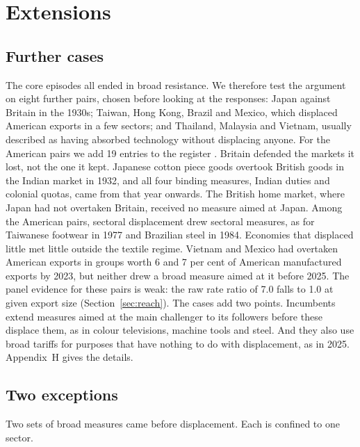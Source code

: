 \documentclass[review,authoryear,12pt]{elsarticle}
\begin{document}
\section{Extensions}\label{sec:extensions}

\subsection{Further cases}\label{sec:further}

The core episodes all ended in broad resistance. We therefore test the argument on eight further pairs, chosen before looking at the responses: Japan against Britain in the 1930s; Taiwan, Hong Kong, Brazil and Mexico, which displaced American exports in a few sectors; and Thailand, Malaysia and Vietnam, usually described as having absorbed technology without displacing anyone. For the American pairs we add 19 entries to the register \citep{statutes,moore1996,dinopoulos1991}. Britain defended the markets it lost, not the one it kept. Japanese cotton piece goods overtook British goods in the Indian market in 1932, and all four binding measures, Indian duties and colonial quotas, came from that year onwards. The British home market, where Japan had not overtaken Britain, received no measure aimed at Japan. Among the American pairs, sectoral displacement drew sectoral measures, as for Taiwanese footwear in 1977 and Brazilian steel in 1984. Economies that displaced little met little outside the textile regime. Vietnam and Mexico had overtaken American exports in groups worth 6 and 7 per cent of American manufactured exports by 2023, but neither drew a broad measure aimed at it before 2025. The panel evidence for these pairs is weak: the raw rate ratio of 7.0 falls to 1.0 at given export size (Section~\ref{sec:reach}). The cases add two points. Incumbents extend measures aimed at the main challenger to its followers before these displace them, as in colour televisions, machine tools and steel. And they also use broad tariffs for purposes that have nothing to do with displacement, as in 2025. Appendix~H gives the details.

\subsection{Two exceptions}\label{sec:exceptions}

Two sets of broad measures came before displacement. Each is confined to one sector.
\end{document}
